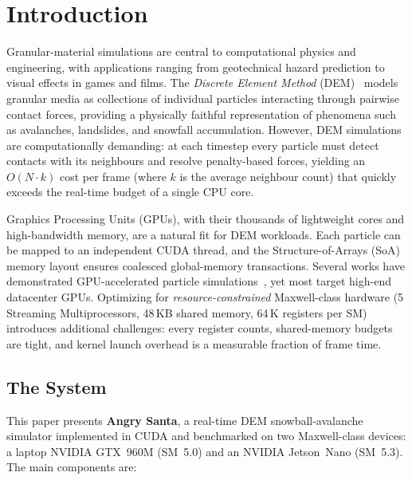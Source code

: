 \section{Introduction}
\label{sec:introduction}

Granular-material simulations are central to computational physics and
engineering, with applications ranging from geotechnical hazard prediction to
visual effects in games and films. The \emph{Discrete Element Method}
(DEM)~\cite{cundall1979} models granular media as collections of individual
particles interacting through pairwise contact forces, providing a physically
faithful representation of phenomena such as avalanches, landslides, and
snowfall accumulation. However, DEM simulations are computationally demanding:
at each timestep every particle must detect contacts with its neighbours and
resolve penalty-based forces, yielding an $O(N \cdot k)$ cost per frame (where
$k$ is the average neighbour count) that quickly exceeds the real-time budget of
a single CPU core.

Graphics Processing Units (GPUs), with their thousands of lightweight cores and
high-bandwidth memory, are a natural fit for DEM workloads. Each particle can
be mapped to an independent CUDA thread, and the Structure-of-Arrays (SoA)
memory layout ensures coalesced global-memory transactions. Several works have
demonstrated GPU-accelerated particle
simulations~\cite{green2010,poschel2005}, yet most target high-end datacenter
GPUs. Optimizing for \emph{resource-constrained} Maxwell-class hardware (5
Streaming Multiprocessors, 48\,KB shared memory, 64\,K registers per SM)
introduces additional challenges: every register counts, shared-memory budgets
are tight, and kernel launch overhead is a measurable fraction of frame time.

\subsection{The System}

This paper presents \textbf{Angry Santa}, a real-time DEM snowball-avalanche
simulator implemented in CUDA and benchmarked on two Maxwell-class devices: a
laptop NVIDIA GTX~960M (SM~5.0) and an NVIDIA Jetson~Nano (SM~5.3). The main
components are:

